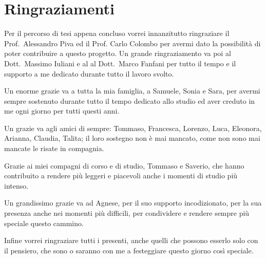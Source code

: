 \chapter*{Ringraziamenti}

Per il percorso di tesi appena concluso vorrei innanzitutto ringraziare il Prof.~Alessandro Piva ed il Prof. Carlo Colombo per avermi dato la possibilità di poter contribuire a questo progetto. Un grande ringraziamento va poi al Dott.~Massimo Iuliani e al al Dott.~Marco Fanfani per tutto il tempo e il supporto a me dedicato durante tutto il lavoro svolto.

Un enorme grazie va a tutta la mia famiglia, a Samuele, Sonia e Sara, per avermi sempre sostenuto durante tutto il tempo dedicato allo studio ed aver creduto in me ogni giorno per tutti questi anni.

Un grazie va agli amici di sempre: Tommaso, Francesca, Lorenzo, Luca, Eleonora, Arianna, Claudia, Talita; il loro sostegno non è mai mancato, come non sono mai mancate le risate in compagnia.

Grazie ai miei compagni di corso e di studio, Tommaso e Saverio, che hanno contribuito a rendere più leggeri e piacevoli anche i momenti di studio più intenso.

Un grandissimo grazie va ad Agnese, per il suo supporto incodizionato, per la sua presenza anche nei momenti più difficili, per condividere e rendere sempre più speciale questo cammino.

Infine vorrei ringraziare tutti i presenti, anche quelli che possono esserlo solo con il pensiero, che sono o saranno con me a festeggiare questo giorno così speciale.
